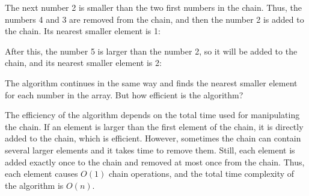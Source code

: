 The next number 2 is smaller than the two first numbers in the chain.
Thus, the numbers 4 and 3 are removed from the chain,
and then the number 2
is added to the chain.
Its nearest smaller element is 1:
\begin{center}
\end{center}

After this, the number 5 is larger than the number 2,
so it will be added to the chain, and
its nearest smaller element is 2:
\begin{center}
\end{center}

The algorithm continues in the same way
and finds the nearest smaller element
for each number in the array.
But how efficient is the algorithm?

The efficiency of the algorithm depends on
the total time used for manipulating the chain.
If an element is larger than the first
element of the chain, it is directly added
to the chain, which is efficient.
However, sometimes the chain can contain several
larger elements and it takes time to remove them.
Still, each element is added exactly once to the chain
and removed at most once from the chain.
Thus, each element causes $O(1)$ chain operations,
and the total time complexity
of the algorithm is $O(n)$.

